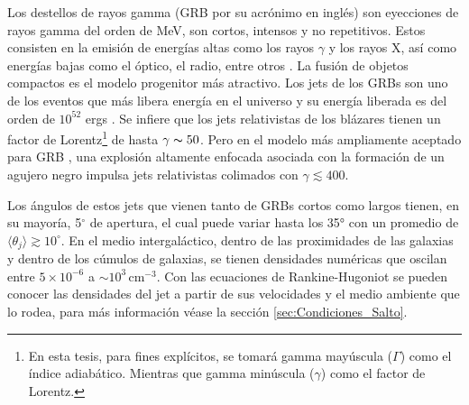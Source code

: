 \documentclass[12pt,a4paper]{book}
\begin{document}
Los destellos de rayos gamma (GRB por su acrónimo en inglés) son eyecciones de rayos gamma del orden de MeV, son cortos, intensos y no repetitivos.
Estos consisten en la emisión de energías altas como los rayos $\gamma$ y los rayos X, así como energías bajas como el óptico, el radio, entre otros \citep{PGRB-piran, Zhang:PGRB}. %
La fusión de objetos compactos es el modelo progenitor más atractivo.
Los jets de los  GRBs son uno de los eventos que más libera energía en el universo y su energía liberada es del orden de $10^{52}$ ergs \citep{Berger:2014jza}.
Se infiere que los jets relativistas de los blázares tienen un factor de Lorentz\footnote{En esta tesis,
para fines explícitos, se tomará gamma mayúscula ($\Gamma$) como el índice adiabático. Mientras que 
gamma minúscula ($\gamma$) como el factor de Lorentz.} de hasta $\gamma \thicksim 50$. 
Pero en el modelo más ampliamente aceptado para GRB \citep{Seo2021}, una explosión altamente enfocada asociada con la formación de un agujero negro impulsa jets relativistas colimados con $\gamma \lesssim 400$. 

Los ángulos de estos jets que vienen tanto de GRBs cortos como largos tienen, en su mayoría, 5$^{\circ}$ de apertura, el cual puede variar hasta los 35° con un promedio de $\langle \theta_j \rangle \gtrsim 10^{\circ}$.
En el medio intergaláctico, dentro de las proximidades de las galaxias y dentro de los cúmulos de galaxias, se tienen densidades numéricas que oscilan entre $5 \times 10^{-6}$ a 
$ \sim 10^3 \, \text{cm}^{-3}$. Con las ecuaciones de Rankine-Hugoniot se pueden conocer las densidades del jet a partir de sus velocidades y el medio ambiente que lo rodea, para más información 
véase la sección \ref{sec:Condiciones_Salto}.
\end{document}
